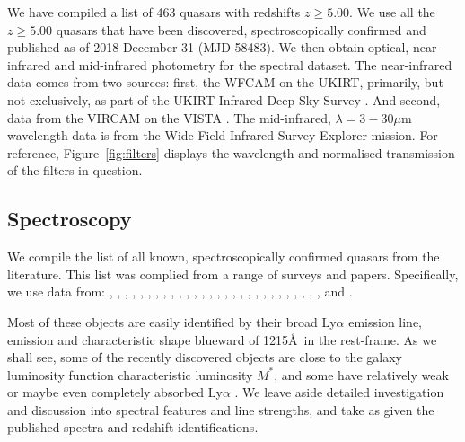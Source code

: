 \documentclass[usenatbib]{mnras}
\begin{document}
We have compiled a list of 463 quasars with redshifts $z\geq5.00$. We
use all the $z\geq5.00$ quasars that have been discovered,
spectroscopically confirmed and published as of 2018 December 31 (MJD
58483). We then obtain optical, near-infrared and mid-infrared
photometry for the spectral dataset. The near-infrared data comes from
two sources: first, the WFCAM \citep[][]{Casali2007} on the UKIRT,
primarily, but not exclusively, as part of the UKIRT Infrared Deep Sky
Survey \citep[UKIDSS; ][]{Lawrence2007}.  And second, data from the
VIRCAM on the VISTA \citep[][]{Emerson2006, Dalton2006}. The
mid-infrared, $\lambda=3-30\mu$m wavelength data is from the 
Wide-Field Infrared Survey Explorer \citep[WISE;][]{Wright2010,
Cutri2013} mission. For reference, Figure~\ref{fig:filters} displays
the wavelength and normalised transmission of the filters in question.

\subsection{Spectroscopy} 
We compile the list of all known, spectroscopically confirmed
quasars from the literature.  This list was complied from a range of
surveys and papers.  Specifically, we use data from:
\citet{Banados2014, Banados2016, Banados2018}, 
\citet{Becker2015}, 
\citet{Calura2014}, 
\citet{Carilli2007, Carilli2010}, 
\citet{Carnall2015}, 
\citet{Cool2006}, 
\citet{DeRosa2011}, 
\citet{Fan2000, Fan2001c, Fan2003, Fan2004, Fan2006, Fan2018}, 
\citet{Goto2006}, 
\citet{Ikeda2017}, 
\citet{Jiang2008, Jiang2009, Jiang2015, Jiang2016},   
\citet{Kashikawa2015}, 
\citet{Koptelova2017}, 
\citet{Kim2015, Kim2018},  
\citet{Kurk2007, Kurk2009}, 
\citet{Leipski2014}, 
\citet{Mahabal2005}, 
\citet{Matsuoka2016,  Matsuoka2018a, Matsuoka2018b},   
\citet{Mazzucchelli2017}, 
\citet{Morganson2012}, 
\citet{Mortlock2009, Mortlock2011},
\citet{McGreer2006, McGreer2013},  
\citet{Reed2015, Reed2017}, 
\citet{Stern2007},  
\citet{Tang2017}, 
\citet{Venemans2007, Venemans2012, Venemans2013, Venemans2015a, Venemans2015b, Venemans2016},
\citet{WangF2016, WangF2017, WangF2018a, WangF2018b},
\citet{Willott2007, Willott2009, Willott2010a, Willott2013b, Willott2015}, 
\citet{Wu2015} 
\citet{YangJ2018a, YangJ2018b}  
and 
\citet{Zeimann2011}. 

Most of these objects are easily identified by their broad Ly$\alpha$
emission line, \nv emission and characteristic shape blueward of
1215\AA\ in the rest-frame. As we shall see, some of the recently
discovered objects are close to the galaxy luminosity function
characteristic luminosity $M^{*}$, and some have relatively weak or
maybe even completely absorbed Ly$\alpha$ \citep[e.g. Figures 7 and 10
in][]{Banados2016}. We leave aside detailed investigation and
discussion into spectral features and line strengths, and take as
given the published spectra and redshift identifications.
\end{document}
